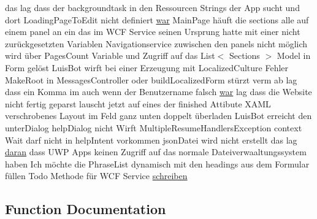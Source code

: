 \begin{DoxyCompactItemize}
das lag dass der backgroundtask in den Ressourcen Strings der App sucht und dort Loading\+Page\+To\+Edit nicht definiert \hyperlink{_r_e_a_d_m_e_8txt_a2a72fc7da943588cba8c302409b22e53}{war} Main\+Page häuft die sections alle auf einem panel an ein das im W\+CF Service seinen Ursprung hatte mit einer nicht zurückgesetzten Variablen Navigationservice zuwischen den panels nicht möglich wird über Pages\+Count Variable und Zugriff auf das List$<$ Sections $>$ Model in Form gelöst Luis\+Bot wirft bei einer Erzeugung mit Localized\+Culture Fehler Make\+Root in Messages\+Controller oder build\+Localized\+Form stürzt verm ab lag dass ein Komma im auch wenn der Benutzername falsch \hyperlink{_r_e_a_d_m_e_8txt_a2a72fc7da943588cba8c302409b22e53}{war} lag dass die Website nicht fertig geparst lauscht jetzt auf eines der finished Attibute X\+A\+ML verschrobenes Layout im Feld ganz unten doppelt überladen Luis\+Bot erreicht den unter\+Dialog help\+Dialog nicht Wirft Multiple\+Resume\+Handlers\+Exception context Wait darf nicht in help\+Intent vorkommen json\+Datei wird nicht erstellt das lag \hyperlink{_r_e_a_d_m_e_8txt_a135543df2f8a787ac2ddeaf87194562c}{daran} dass U\+WP Apps keinen Zugriff auf das normale Dateiverwaaltungssystem haben Ich möchte die Phrase\+List dynamisch mit den headings aus dem Formular füllen Todo Methode für W\+CF Service \hyperlink{_r_e_a_d_m_e_8txt_a7cfea504e3a5e9a3a42e1f0a414a9efa}{schreiben}
\end{DoxyCompactItemize}


\subsection{Function Documentation}
